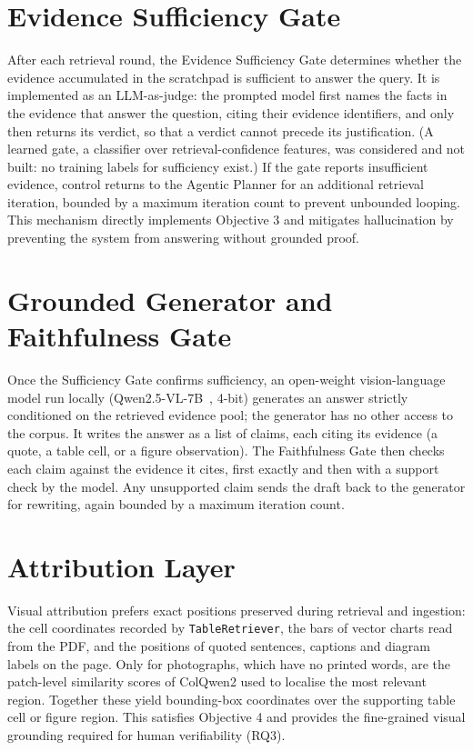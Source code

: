 \section{Evidence Sufficiency Gate}
After each retrieval round, the Evidence Sufficiency Gate determines whether the evidence accumulated in the scratchpad is sufficient to answer the query. It is implemented as an LLM-as-judge: the prompted model first names the facts in the evidence that answer the question, citing their evidence identifiers, and only then returns its verdict, so that a verdict cannot precede its justification. (A learned gate, a classifier over retrieval-confidence features, was considered and not built: no training labels for sufficiency exist.) If the gate reports insufficient evidence, control returns to the Agentic Planner for an additional retrieval iteration, bounded by a maximum iteration count to prevent unbounded looping. This mechanism directly implements Objective 3 and mitigates hallucination by preventing the system from answering without grounded proof.

\section{Grounded Generator and Faithfulness Gate}
Once the Sufficiency Gate confirms sufficiency, an open-weight vision-language model run locally (Qwen2.5-VL-7B~\cite{bai2025qwen25vl}, 4-bit) generates an answer strictly conditioned on the retrieved evidence pool; the generator has no other access to the corpus. It writes the answer as a list of claims, each citing its evidence (a quote, a table cell, or a figure observation). The Faithfulness Gate then checks each claim against the evidence it cites, first exactly and then with a support check by the model. Any unsupported claim sends the draft back to the generator for rewriting, again bounded by a maximum iteration count.

\section{Attribution Layer}
Visual attribution prefers exact positions preserved during retrieval and ingestion: the cell coordinates recorded by \texttt{TableRetriever}, the bars of vector charts read from the PDF, and the positions of quoted sentences, captions and diagram labels on the page. Only for photographs, which have no printed words, are the patch-level similarity scores of ColQwen2 used to localise the most relevant region. Together these yield bounding-box coordinates over the supporting table cell or figure region. This satisfies Objective 4 and provides the fine-grained visual grounding required for human verifiability (RQ3).

